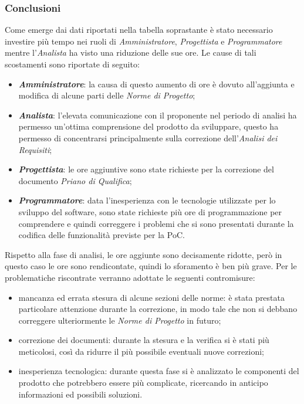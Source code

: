 \subsubsection{Conclusioni}
Come emerge dai dati riportati nella tabella soprastante è stato necessario investire più tempo nei ruoli di \textit{Amministratore}, \textit{Progettista} e \textit{Programmatore} mentre l'\textit{Analista} ha visto una riduzione delle sue ore. Le cause di tali scostamenti sono riportate di seguito:
\begin{itemize}
	\item \textbf{\textit{Amministratore}}: la causa di questo aumento di ore è dovuto all'aggiunta e modifica di alcune parti delle \textit{Norme di Progetto};
	\item \textbf{\textit{Analista}}: l'elevata comunicazione con il proponente nel periodo di analisi ha permesso un'ottima comprensione del prodotto da sviluppare, questo ha permesso di concentrarsi principalmente sulla correzione dell'\textit{Analisi dei Requisiti};
	\item \textbf{\textit{Progettista}}: le ore aggiuntive sono state richieste per la correzione del documento \textit{Priano di Qualifica};
	\item \textbf{\textit{Programmatore}}: data l'inesperienza con le tecnologie utilizzate per lo sviluppo del software, sono state richieste più ore di programmazione per comprendere e quindi correggere i problemi che si sono presentati durante la codifica delle funzionalità previste per la PoC.
\end{itemize}

Rispetto alla fase di analisi, le ore aggiunte sono decisamente ridotte, però in questo caso le ore sono rendicontate, quindi lo sforamento è ben più grave. Per le problematiche riscontrate verranno adottate le seguenti contromisure: 
\begin{itemize}
	\item mancanza ed errata stesura di alcune sezioni delle norme: è stata prestata particolare attenzione durante la correzione, in modo tale che non si debbano correggere ulteriormente le \textit{Norme di Progetto} in futuro;
	\item correzione dei documenti: durante la stesura e la verifica si è stati più meticolosi, così da ridurre il più possibile eventuali nuove correzioni;
	\item inesperienza tecnologica: durante questa fase si è analizzato le componenti del prodotto che potrebbero essere più complicate, ricercando in anticipo informazioni ed possibili soluzioni.
\end{itemize}

